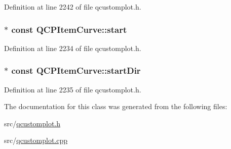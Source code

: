 Definition at line 2242 of file qcustomplot.\-h.

\hypertarget{class_q_c_p_item_curve_a20c3b5ea31c33764f4f30c2ec7ae518b}{
\subsubsection[{start}]{$\ast$ const Q\-C\-P\-Item\-Curve\-::start}}\label{class_q_c_p_item_curve_a20c3b5ea31c33764f4f30c2ec7ae518b}


Definition at line 2234 of file qcustomplot.\-h.

\hypertarget{class_q_c_p_item_curve_aa124bf66c09cc51c627fb49db8bf8a7b}{
\subsubsection[{start\-Dir}]{$\ast$ const Q\-C\-P\-Item\-Curve\-::start\-Dir}}\label{class_q_c_p_item_curve_aa124bf66c09cc51c627fb49db8bf8a7b}


Definition at line 2235 of file qcustomplot.\-h.



The documentation for this class was generated from the following files\-:\begin{DoxyCompactItemize}
\item 
src/\hyperlink{qcustomplot_8h}{qcustomplot.\-h}\item 
src/\hyperlink{qcustomplot_8cpp}{qcustomplot.\-cpp}\end{DoxyCompactItemize}
